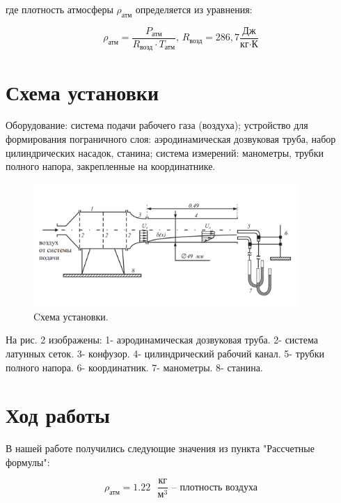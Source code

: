 \documentclass[a4paper]{article}
\begin{document}
где плотность атмосферы $\rho_{\text{атм}}$ определяется из уравнения:

$$ \rho_{\text{атм}} = \frac{P_{\text{атм}}}{ R_{\text{возд}} \cdot T_{\text{атм}}} \text{, } R_{\text{возд}} = 286,7 \frac{ \text{Дж} }{ \text{кг} \cdot \text{К} } $$

\newpage



\section*{Схема установки}

Оборудование: система подачи рабочего газа (воздуха); устройство для формирования пограничного слоя: аэродинамическая дозвуковая труба, набор цилиндрических насадок, станина; система измерений: манометры, трубки полного напора, закрепленные на координатнике. 
\begin {figure}[H]
\begin{center}
\par
\includegraphics[width=0.9\textwidth]{1.png}
\caption{Cхема установки.}
\end{center}
\end {figure}

На рис. 2 изображены:  1- аэродинамическая дозвуковая труба. 2- система латунных сеток. 3- конфузор. 4- цилиндрический рабочий канал. 5- трубки полного напора. 6-  координатник. 7- манометры. 8- станина.





\section*{Ход работы}

В нашей работе получились следующие значения из пункта "Рассчетные формулы":


$$\rho_\text{атм} = 1.22 \text{ } \frac{\text{кг}}{\text{м}^3}  \text{ -- плотность воздуха}$$
\end{document}
